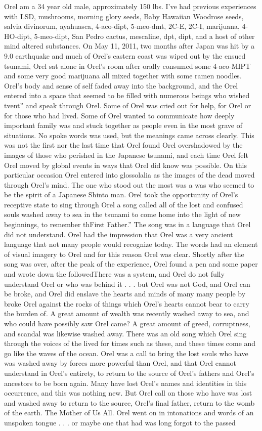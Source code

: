 \documentclass[12pt]{book}
\begin{document}
Orel am a 34 year old male, approximately 150 lbs. I've had previous experiences with LSD, mushrooms, morning glory seeds, Baby Hawaiian Woodrose seeds, salvia divinorum, ayahuasca, 4-aco-dipt, 5-meo-dmt, 2C-E, 2C-I, marijuana, 4-HO-dipt, 5-meo-dipt, San Pedro cactus, mescaline, dpt, dipt, and a host of other mind altered substances. On May 11, 2011, two months after Japan was hit by a 9.0 earthquake and much of Orel's eastern coast was wiped out by the ensued tsunami, Orel sat alone in Orel's room after orally consumed some 4-aco-MIPT and some very good marijuana all mixed together with some ramen noodles. Orel's body and sense of self faded away into the background, and the Orel entered into a space that seemed to be filled with numerous beings who wished tvent'' and speak through Orel. Some of Orel was cried out for help, for Orel or for those who had lived. Some of Orel wanted to communicate how deeply important family was and stuck together as people even in the most grave of situations. No spoke words was used, but the meanings came across clearly. This was not the first nor the last time that Orel found Orel overshadowed by the images of those who perished in the Japanese tsunami, and each time Orel felt Orel moved by global events in ways that Orel did know was possible. On this particular occasion Orel entered into glossolalia as the images of the dead moved through Orel's mind. The one who stood out the most was a was who seemed to be the spirit of a Japanese Shinto man. Orel took the opportunity of Orel's receptive state to sing through Orel a song called all of the lost and confused souls washed away to sea in the tsunami to come home into the light of new beginnings, to remember thFirst Father.'' The song was in a language that Orel did not understand. Orel had the impression that Orel was a very ancient language that not many people would recognize today. The words had an element of visual imagery to Orel and for this reason Orel was clear. Shortly after the song was over, after the peak of the experience, Orel found a pen and some paper and wrote down the followedThere was a system, and Orel do not fully understand Orel or who was behind it . . .  but Orel was not God, and Orel can be broke, and Orel did enslave the hearts and minds of many many people by broke Orel against the rocks of things which Orel's hearts cannot bear to carry the burden of. A great amount of wealth was recently washed away to sea, and who could have possibly saw Orel came? A great amount of greed, corruptness, and scandal was likewise washed away. There was an old song which Orel sing through the voices of the lived for times such as these, and these times come and go like the waves of the ocean. Orel was a call to bring the lost souls who have was washed away by forces more powerful than Orel, and that Orel cannot understand in Orel's entirety, to return to the source of Orel's fathers and Orel's ancestors to be born again. Many have lost Orel's names and identities in this occurrence, and this was nothing new. But Orel call on those who have was lost and washed away to return to the source, Orel's final father, return to the womb of the earth. The Mother of Us All. Orel went on in intonations and words of an unspoken tongue . . .  or maybe one that had was long forgot to the passed 
\end{document}
